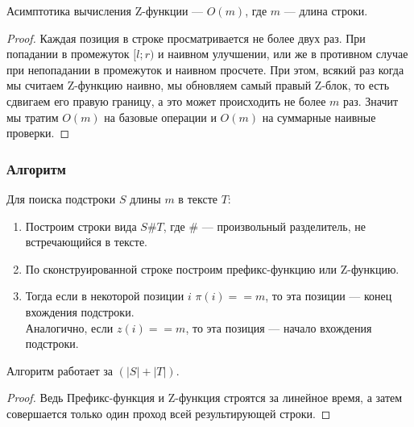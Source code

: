 \begin{prop}
	Асимптотика вычисления Z-функции --- $O(m)$, где $m$ --- длина строки.
\end{prop}
\begin{proof}
	Каждая позиция в строке просматривается не более двух раз. При попадании в промежуток $[l; r)$ и наивном улучшении, или же в противном случае при непопадании в промежуток и наивном просчете. При этом, всякий раз когда мы считаем Z-функцию наивно, мы обновляем самый правый Z-блок, то есть сдвигаем его правую границу, а это может происходить не более $m$ раз. Значит мы тратим $O(m)$ на базовые операции и $O(m)$ на суммарные наивные проверки.
\end{proof}

\newpage

\subsubsection{Алгоритм}
Для поиска подстроки $S$ длины $m$ в тексте  $T$:
\begin{enumerate}
	\item Построим строки вида $S\#T$, где $\#$ --- произвольный разделитель, не встречающийся в тексте.
	\item По сконструированной строке построим префикс-функцию или Z-функцию.
	\item Тогда если в некоторой позиции  $i$ $\pi(i) == m$, то эта позиции --- конец вхождения подстроки. \\
		Аналогично, если $z(i) == m$, то эта позиция --- начало вхождения подстроки.
\end{enumerate}

\begin{prop}
	Алгоритм работает за $(\lvert S \rvert + \lvert T \rvert)$.
\end{prop}
\begin{proof}
	Ведь Префикс-функция и Z-функция строятся за линейное время, а затем совершается только один проход всей результирующей строки.	
\end{proof}
